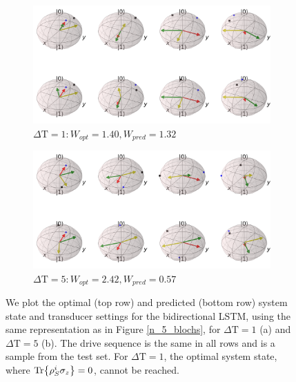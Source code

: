 \begin{figure}
	\centering
	\begin{subfigure}{0.85\textwidth}
		\centering
		\includegraphics[width=\textwidth]{img/bloch_comp_1_crop}
		\caption{$\Delta \mathrm{T} = 1: W_{opt} = 1.40, W_{pred} = 1.32$}
		\label{}
	\end{subfigure}
	\begin{subfigure}{0.85\textwidth}
		\centering
		\includegraphics[width=\textwidth]{img/bloch_comp_5_crop}
		\caption{$\Delta \mathrm{T} = 5: W_{opt} = 2.42, W_{pred} = 0.57$}
		\label{}
	\end{subfigure}
	\caption{We plot the optimal (top row) and predicted (bottom row) system state and transducer settings for the bidirectional LSTM, using the same representation as in Figure \ref{n_5_blochs}, for $\Delta \mathrm{T} = 1$ (a) and $\Delta \mathrm{T} = 5$ (b). The drive sequence is the same in all rows and is a sample from the test set. For $\Delta \mathrm{T} = 1$, the optimal system state, where $\Tr{\rho_S^i \sigma_z} = 0$, cannot be reached.}
	\label{blochsdt15}
\end{figure}
